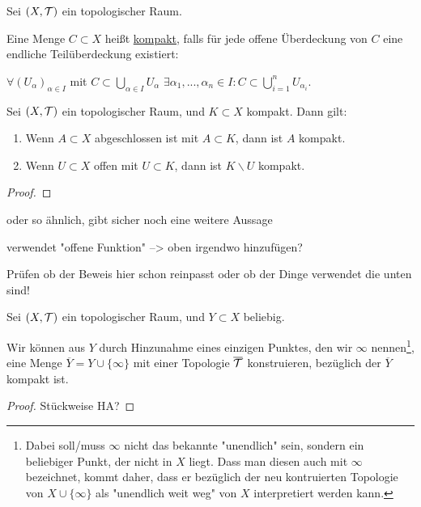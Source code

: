 \begin{definition}[kompakt]
    Sei $(X, \mathcal{T})$ ein topologischer Raum.

    Eine Menge $C \subset X$ heißt \underline{kompakt}, falls für jede offene Überdeckung von $C$ eine endliche Teilüberdeckung existiert:

    $\forall (U_{\alpha})_{\alpha \in I}$ mit $C \subset \bigcup\limits_{\alpha \in I} U_{\alpha}$ $\exists \alpha_1, ..., \alpha_n \in I: C \subset \bigcup\limits_{i=1}^{n} U_{\alpha_i}$.
\end{definition}

\begin{lemma}
    \label{lem-compact-sets-are-closed}
\end{lemma}

\begin{lemma}
    Sei $(X, \mathcal{T})$ ein topologischer Raum, und $K \subset X$ kompakt. Dann gilt:
    \begin{enumerate}
        \item Wenn $A \subset X$ abgeschlossen ist mit $A \subset K$, dann ist $A$ kompakt.
        \item Wenn $U \subset X$ offen mit $U \subset K$, dann ist $K \backslash U$ kompakt.
    \end{enumerate}
\end{lemma}
\begin{proof}
    
\end{proof}

\begin{lemma}
    oder so ähnlich, gibt sicher noch eine weitere Aussage

    verwendet "offene Funktion" --> oben irgendwo hinzufügen?

    Prüfen ob der Beweis hier schon reinpasst oder ob der Dinge verwendet die unten sind!
\end{lemma}

\begin{proposition}[Punktkompaktifizierung]
    Sei $(X, \mathcal{T})$ ein topologischer Raum, und $Y \subset X$ beliebig.

    Wir können aus $Y$ durch Hinzunahme eines einzigen Punktes, den wir $\infty$ nennen\footnote{Dabei soll/muss $\infty$ nicht das bekannte "unendlich" sein, sondern ein beliebiger Punkt, der nicht in $X$ liegt. Dass man diesen auch mit $\infty$ bezeichnet, kommt daher, dass er bezüglich der neu kontruierten Topologie von $X \cup \{\infty\}$ als "unendlich weit weg" von $X$ interpretiert werden kann.}, eine Menge $\overline{Y} = Y \cup \{\infty\}$ mit einer Topologie $\overline{\mathcal{T}}$ konstruieren, bezüglich der $\overline{Y}$ kompakt ist.
\end{proposition}
\begin{proof}
    Stückweise HA?
\end{proof}




